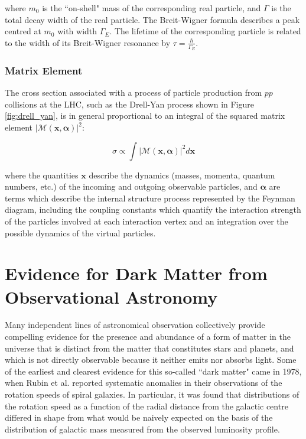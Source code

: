 \noindent where \(m_0\) is the ``on-shell" mass of the corresponding real particle, and \(\Gamma\) is the total decay width of the real particle. The Breit-Wigner formula describes a peak centred at \(m_0\) with width \(\Gamma_E\). The lifetime of the corresponding particle is related to the width of its Breit-Wigner resonance by \(\tau = \frac{\hbar}{\Gamma_E}\).

\subsubsection{Matrix Element}


The cross section associated with a process of particle production from \(pp\) collisions at the LHC, such as the Drell-Yan process shown in Figure \ref{fig:drell_yan}, is in general proportional to an integral of the squared matrix element \(|\mathcal{M(\boldsymbol{x}, \boldsymbol{\alpha})}|^2\):

\begin{equation}
\label{eq:matrix_element}
\sigma \propto \int|\mathcal{M(\boldsymbol{x}, \boldsymbol{\alpha})}|^2 d\boldsymbol{x} 
\end{equation}

\noindent where the quantities \(\boldsymbol{x}\) describe the dynamics (masses, momenta, quantum numbers, etc.) of the incoming and outgoing observable particles, and \(\boldsymbol{\alpha}\) are terms which describe the internal structure process represented by the Feynman diagram, including the coupling constants which quantify the interaction strength of the particles involved at each interaction vertex and an integration over the possible dynamics of the virtual particles. 


\section{Evidence for Dark Matter from Observational Astronomy}

Many independent lines of astronomical observation collectively provide compelling evidence for the presence and abundance of a form of matter in the universe that is distinct from the matter that constitutes stars and planets, and which is not directly observable because it neither emits nor absorbs light. Some of the earliest and clearest evidence for this so-called ``dark matter" came in 1978, when Rubin et al. \cite{Rubin_et_al} reported systematic anomalies in their observations of the rotation speeds of spiral galaxies. In particular, it was found that distributions of the rotation speed as a function of the radial distance from the galactic centre differed in shape from what would be naively expected on the basis of the distribution of galactic mass measured from the observed luminosity profile. 

